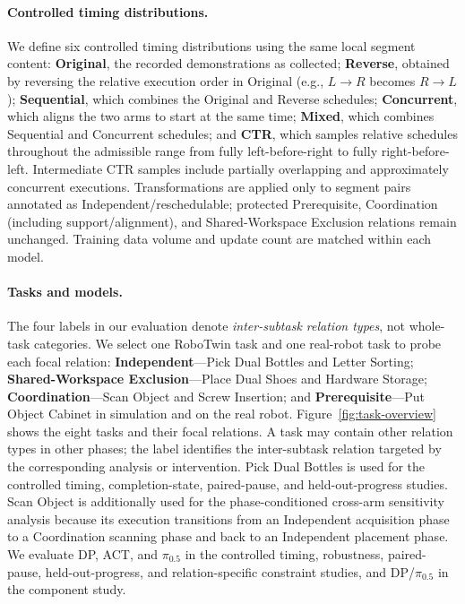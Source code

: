 \documentclass{article}
\newcommand{\method}{CTR}
\begin{document}
\paragraph{Controlled timing distributions.}
We define six controlled timing distributions using the same local segment content: \textbf{Original}, the recorded demonstrations as collected; \textbf{Reverse}, obtained by reversing the relative execution order in Original (e.g., $L\!\rightarrow\!R$ becomes $R\!\rightarrow\!L$); \textbf{Sequential}, which combines the Original and Reverse schedules; \textbf{Concurrent}, which aligns the two arms to start at the same time; \textbf{Mixed}, which combines Sequential and Concurrent schedules; and \textbf{\method}, which samples relative schedules throughout the admissible range from fully left-before-right to fully right-before-left. Intermediate \method{} samples include partially overlapping and approximately concurrent executions. Transformations are applied only to segment pairs annotated as Independent/reschedulable; protected Prerequisite, Coordination (including support/alignment), and Shared-Workspace Exclusion relations remain unchanged. Training data volume and update count are matched within each model.

\paragraph{Tasks and models.}
The four labels in our evaluation denote \emph{inter-subtask relation types}, not whole-task categories. We select one RoboTwin task and one real-robot task to probe each focal relation: \textbf{Independent}---Pick Dual Bottles and Letter Sorting; \textbf{Shared-Workspace Exclusion}---Place Dual Shoes and Hardware Storage; \textbf{Coordination}---Scan Object and Screw Insertion; and \textbf{Prerequisite}---Put Object Cabinet in simulation and on the real robot. Figure~\ref{fig:task-overview} shows the eight tasks and their focal relations. A task may contain other relation types in other phases; the label identifies the inter-subtask relation targeted by the corresponding analysis or intervention. Pick Dual Bottles is used for the controlled timing, completion-state, paired-pause, and held-out-progress studies. Scan Object is additionally used for the phase-conditioned cross-arm sensitivity analysis because its execution transitions from an Independent acquisition phase to a Coordination scanning phase and back to an Independent placement phase. We evaluate DP, ACT, and $\pi_{0.5}$ in the controlled timing, robustness, paired-pause, held-out-progress, and relation-specific constraint studies, and DP/$\pi_{0.5}$ in the component study.
\end{document}
